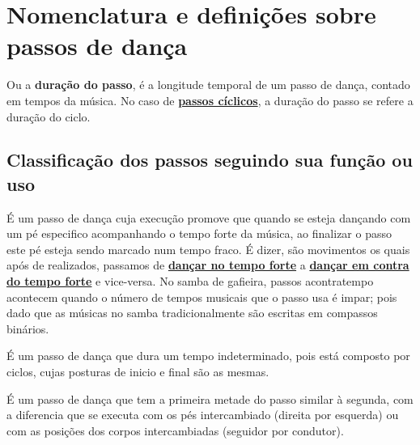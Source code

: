 
\section{Nomenclatura e definições sobre passos de dança}



\begin{definition} 
\label{def:DuracaoDoPasso}
Ou a \textbf{duração do passo}, 
é a longitude temporal de um passo de dança, contado em tempos da música.
No caso de \hyperref[def:PassoCiclico]{\textbf{passos cíclicos}}, a duração do passo se refere a duração do ciclo.
\end{definition}

\subsection{Classificação dos passos seguindo sua função ou uso}

\begin{definition} 
\label{def:PassoAContratempo}
É um passo de dança cuja execução promove que quando se esteja dançando com um pé especifico acompanhando o tempo forte da música,
ao finalizar o passo este pé esteja sendo marcado num tempo fraco.
É dizer, são movimentos os quais após de realizados, 
passamos de \hyperref[def:DancaNoTempo]{\textbf{dançar no tempo forte}} a 
\hyperref[def:DancaNoContratempo]{\textbf{dançar em contra do tempo forte}} e vice-versa. 
No samba de gafieira, 
passos acontratempo acontecem quando o número de tempos musicais que o passo usa é impar;
pois dado que as músicas no samba tradicionalmente são escritas em compassos binários. 
\end{definition}


\begin{definition} 
\label{def:PassoCiclico}
É um passo de dança que dura um tempo indeterminado,
pois está composto por ciclos, cujas posturas de inicio e final são as mesmas.
\end{definition}

\begin{definition} 
\label{def:PassoSimetrico}
É um passo de dança que tem a primeira metade do passo similar à segunda,
com a diferencia que se executa com os pés intercambiado (direita por esquerda)
ou com as posições dos corpos intercambiadas (seguidor por condutor).
\end{definition}

